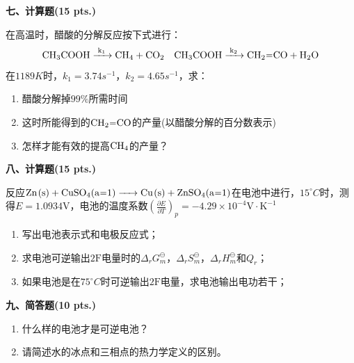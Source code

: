 \vspace{0.5cm}
\noindent\textbf{七、计算题(15 pts.)}

在高温时，醋酸的分解反应按下式进行：
\[
\ce{CH_{3}COOH ->[k_1] CH_{4} + CO_{2}} \quad \ce{CH_{3}COOH ->[k_2] CH_{2}=CO + H_{2}O}
\]
在$1189K$时，$k_1=3.74s^{-1}$，$k_2=4.65s^{-1}$，求：
\begin{enumerate}[label=(\arabic*), itemsep=1ex]
    \item 醋酸分解掉$99\%$所需时间
    \item 这时所能得到的$\ce{CH_{2}=CO}$的产量(以醋酸分解的百分数表示)
    \item 怎样才能有效的提高$\ce{CH_{4}}$的产量？
\end{enumerate}

\vspace{0.5cm}
\noindent\textbf{八、计算题(15 pts.)}

反应$\ce{Zn(s) + CuSO_{4}(a=1) -> Cu(s) + ZnSO_{4}(a=1)}$在电池中进行，$15^\circ C$时，测得$E=1.0934\mathrm{V}$，电池的温度系数$\left(\frac{\partial E}{\partial T}\right)_p=-4.29\times10^{-4}\mathrm{V\cdot K^{-1}}$
\begin{enumerate}[label=(\arabic*), itemsep=1ex]
    \item 写出电池表示式和电极反应式；
    \item 求电池可逆输出$2\mathrm{F}$电量时的$\Delta_rG_m^\ominus$，$\Delta_rS_m^\ominus$，$\Delta_rH_m^\ominus$和$Q_r$；
    \item 如果电池是在$75^\circ C$时可逆输出$2\mathrm{F}$电量，求电池输出电功若干；
\end{enumerate}

\vspace{0.5cm}
\noindent\textbf{九、简答题(10 pts.)}

\begin{enumerate}[label=\arabic*., itemsep=1.5ex]
    \item 什么样的电池才是可逆电池？
    \item 请简述水的冰点和三相点的热力学定义的区别。
\end{enumerate}